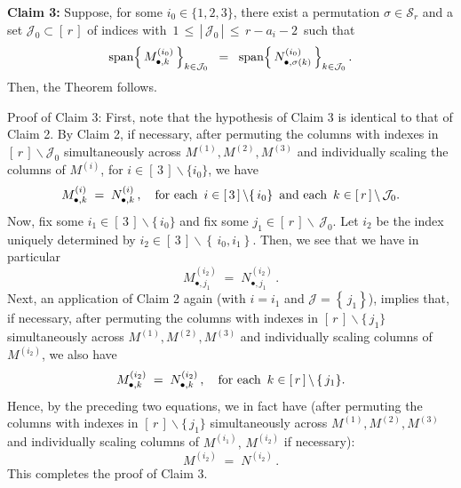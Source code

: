 \vskip 0.5cm
\begin{center}
\begin{minipage}{6.0in}
\textbf{Claim 3:}
\vskip 0.025cm
\noindent
Suppose, for some $i_{0} \in \{1,2,3\}$, there exist a permutation $\sigma \in \mathcal{S}_{r}$
and a set $\mathcal{J}_{0} \subset \left[\,r\,\right]$ of indices with
\,$1 \,\leq\, \left\vert\,\mathcal{J}_{0}\,\right\vert \,\leq\, r - a_{i} - 2$\, such that
\begin{equation*}
\textnormal{span}\!\left\{\,M^{(i_{0})}_{\bullet,k}\,\right\}_{k\in\mathcal{J}_{0}}
\;\; = \;\;
\textnormal{span}\!\left\{\,N^{(i_{0})}_{\bullet,\sigma(k)}\,\right\}_{k\in\mathcal{J}_{0}}.
\end{equation*}
Then, the Theorem follows.
\end{minipage}
\end{center}
Proof of Claim 3:\; First, note that the hypothesis of Claim 3 is identical to that of Claim 2.
By Claim 2, if necessary,
after permuting the columns with indexes in $\left[\,r\,\right]\backslash\mathcal{J}_{0}$
simultaneously across $M^{(1)},M^{(2)},M^{(3)}$ and
individually scaling the columns of $M^{(i)}$, for $i \in [\,3\,]\backslash\{i_{0}\}$, we have
\begin{equation*}
M^{(i)}_{\bullet,k} \;=\; N^{(i)}_{\bullet,k}\,,
\quad
\textnormal{for each \,$i \in \left[\,3\,\right]\backslash\{\,i_{0}\}$\, and each \,$k \in \left[\,r\,\right] \backslash\,\mathcal{J}_{0}$}.
\end{equation*}
Now, fix some $i_{1} \in \left[\,3\,\right]\backslash\{\,i_{0}\}$ and
fix some $j_{1} \in \left[\,r\,\right] \backslash\,\mathcal{J}_{0}$.
Let $i_{2}$ be the index uniquely determined by $i_{2} \in \left[\,3\,\right] \backslash \left\{\,i_{0},i_{1}\right\}$.
Then, we see that we have in particular
\begin{equation*}
M^{(i_{2})}_{\bullet,j_{1}} \;=\; N^{(i_{2})}_{\bullet,j_{1}}\,.
\end{equation*}
Next, an application of Claim 2 again (with $i = i_{1}$ and $\mathcal{J} = \left\{\,j_{1}\right\}$),
implies that, if necessary,
after permuting the columns with indexes in $\left[\,r\,\right]\backslash\{\,j_{1}\}$
simultaneously across $M^{(1)},M^{(2)},M^{(3)}$ and individually scaling columns of $M^{(i_{2})}$,
we also have
\begin{equation*}
M^{(i_{2})}_{\bullet,k} \;=\; N^{(i_{2})}_{\bullet,k}\,,
\quad
\textnormal{for each \,$k \in \left[\,r\,\right] \backslash\left\{\,j_{1}\right\}$}.
\end{equation*}
Hence, by the preceding two equations, we in fact have
(after permuting the columns with indexes in $\left[\,r\,\right]\backslash\{\,j_{1}\}$
simultaneously across $M^{(1)},M^{(2)},M^{(3)}$ and
individually scaling columns of $M^{(i_{1})},\,M^{(i_{2})}$ if necessary):
\begin{equation*}
M^{(i_{2})} \;=\; N^{(i_{2})}\,.
\end{equation*}
This completes the proof of Claim 3.

